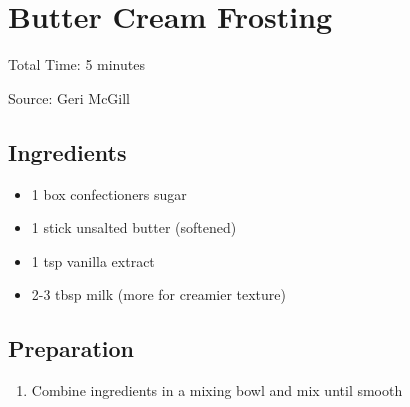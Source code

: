 \section{Butter Cream Frosting}

\begin{center}
Total Time: 5 minutes

\vspace{1em}

Source: Geri McGill

\end{center}

\subsection{Ingredients}
\begin{itemize}
    \item 1 box confectioners sugar
    \item 1 stick unsalted butter (softened)
    \item 1 tsp vanilla extract
    \item 2-3 tbsp milk (more for creamier texture)
\end{itemize}

\subsection{Preparation}
\begin{enumerate}
    \item Combine ingredients in a mixing bowl and mix until smooth
\end{enumerate}


